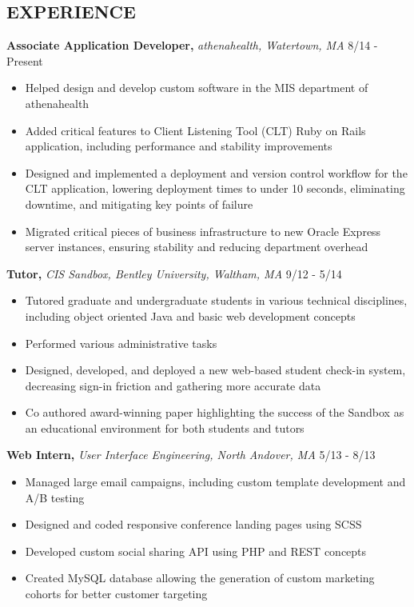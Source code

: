 \documentclass[line, margin]{res}
\begin{document}
\begin{resume}
\section{EXPERIENCE}
\textbf{Associate Application Developer,} \textit{athenahealth, Watertown, MA} \hfill 8/14 - Present
\begin{itemize}
    \item Helped design and develop custom software in the MIS department of athenahealth
    \item Added critical features to Client Listening Tool (CLT) Ruby on Rails application, including performance and stability improvements
    \item Designed and implemented a deployment and version control workflow for the CLT application, lowering deployment times to under 10 seconds, eliminating downtime, and mitigating key points of failure
    \item Migrated critical pieces of business infrastructure to new Oracle Express server instances, ensuring stability and reducing department overhead
\end{itemize}
\textbf{Tutor,} \textit{CIS Sandbox, Bentley University, Waltham, MA} \hfill 9/12 - 5/14
\begin{itemize}
    \item Tutored graduate and undergraduate students in various technical disciplines, including object oriented Java and basic web development concepts
    \item Performed various administrative tasks
    \item Designed, developed, and deployed a new web-based student check-in system, decreasing sign-in friction and gathering more accurate data
    \item Co authored award-winning paper highlighting the success of the Sandbox as an educational environment for both students and tutors
\end{itemize}
\textbf{Web Intern,} \textit{User Interface Engineering, North Andover, MA} \hfill 5/13 - 8/13
\begin{itemize}
    \item Managed large email campaigns, including custom template development and A/B testing
    \item Designed and coded responsive conference landing pages using SCSS
    \item Developed custom social sharing API using PHP and REST concepts
    \item Created MySQL database allowing the generation of custom marketing cohorts for better customer targeting

\end{itemize}
\end{resume}
\end{document}
